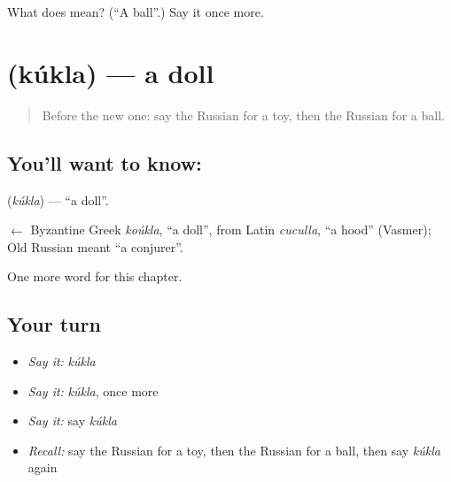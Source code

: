 \begin{tcolorbox}[breakable,colback=teal!4,colframe=teal!35!black,title={Before you move on}]
What does  mean? (\textquotedblleft{}A ball\textquotedblright{}.) Say it once more.
\end{tcolorbox}
\section[\texorpdfstring{\ru{кукла} (kúkla)}{кукла (kúkla)}]{ (kúkla) — a doll}

\label{lesson:RU-C221-kukla}



\begin{quote}
Before the new one: say the Russian for a toy, then the Russian for a ball.
\end{quote}

\subsection*{You'll want to know: }
\textbf{} (\emph{kúkla}) — \textquotedblleft{}a doll\textquotedblright{}.

\begin{cousinweb}
\textbf{} $\leftarrow$ Byzantine Greek \emph{koúkla}, \textquotedblleft{}a doll\textquotedblright{}, from Latin \emph{cuculla}, \textquotedblleft{}a hood\textquotedblright{} (Vasmer); Old Russian \emph{} meant \textquotedblleft{}a conjurer\textquotedblright{}.
\end{cousinweb}

\begin{grammarlens}[title={What you've built}]
One more word for this chapter.
\end{grammarlens}

\subsection*{Your turn}
\begin{itemize}
\raggedright
  \item \emph{Say it:} \emph{kúkla}
  \item \emph{Say it:} \emph{kúkla}, once more
  \item \emph{Say it:} say \emph{kúkla}
  \item \emph{Recall:} say the Russian for a toy, then the Russian for a ball, then say \emph{kúkla} again
\end{itemize}

